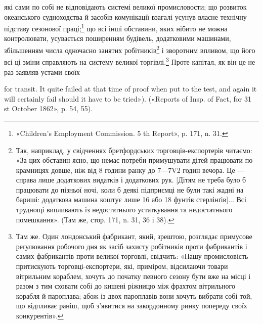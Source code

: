 які сами по собі не відповідають системі великої промисловости;
що розвиток океанського судноходства й засобів комунікації
взагалі усунув власне технічну підставу сезонової праці;\footnote{
«Children’s Employment Commission. 5 th Report», p. 171, n. 31.
}
що всі інші обставини, яких нібито не можна контролювати,
усувається поширенням будівель, додатковими машинами, збільшенням числа одночасно занятих робітників\footnote{
Так, наприклад, у свідченнях бретфордських торговців-експортерів читаємо: «За цих обставин
ясно, що немає потреби примушувати
дітей працювати по крамницях довше, ніж від 8 години ранку до 7—7V2 годин вечора. Це — справа лише
додаткових видатків і додаткових рук.
[Дітям не треба було б працювати до пізньої ночі, коли б деякі підприємці не були такі жадні на
бариші: додаткова машина коштує лише
16 або 18 фунтів стерлінґів]... Всі труднощі випливають із недостатнього
устаткування та недостатнього помешкання». (Там же, стор. 171, n. 31,
36 і 38).
} і зворотним впливом, що його всі ці зміни справляють на систему великої торгівлі.\footnote{
Там же. Один лондонський фабрикант, який, зрештою, розглядає
примусове реґулювання робочого дня як засіб захисту робітників проти
фабрикантів і самих фабрикантів проти великої торговлі, свідчить: «Нашу
промисловість притискують торговці-експортери, які, приміром, відсилаючи товари вітрильним кораблем,
хочуть до початку певного сезону
бути вже на місці і разом з тим сховати собі до кишені ріжницю між
фрахтом вітрильного корабля й пароплава; абож із двох пароплавів вони
хочуть вибрати собі той, що відпливає раніш, щоб з’явитися на закордонному ринку попереду своїх
конкурентів».
}  Проте
капітал, як він це не раз заявляв устами своїх

for transit. It quite failed at that time of proof when put to the test, and
again it will certainly fail should it have to be tried»). («Reports of Insp.
of Fact, for 31 st October 1862», p. 54, 55).
\parbreak{}  %
